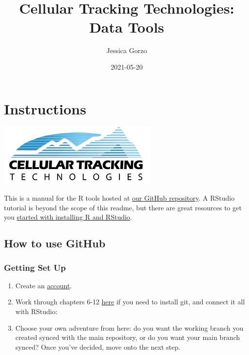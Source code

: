 \documentclass[
]{book}
\title{Cellular Tracking Technologies: Data Tools}
\author{Jessica Gorzo}
\date{2021-05-20}
\providecommand{\tightlist}{%
  \setlength{\itemsep}{0pt}\setlength{\parskip}{0pt}}
\begin{document}
\maketitle

{
\setcounter{tocdepth}{1}
\tableofcontents
}
\hypertarget{instructions}{%
\chapter*{Instructions}\label{instructions}}

\includegraphics{bookdown-demo_files/figure-html/unnamed.png}

This is a manual for the R tools hosted at \href{https://github.com/cellular-tracking-technologies/data_tools}{our GitHub repository}. A RStudio tutorial is beyond the scope of this readme, but there are great resources to get you \href{https://www.earthdatascience.org/courses/earth-analytics/document-your-science/setup-r-rstudio/}{started with installing R and RStudio}.

\hypertarget{how-to-use-github}{%
\section*{How to use GitHub}\label{how-to-use-github}}

\hypertarget{getting-set-up}{%
\subsection*{Getting Set Up}\label{getting-set-up}}

\begin{enumerate}
\def\labelenumi{\arabic{enumi}.}
\tightlist
\item
  Create an \href{https://github.com}{account}.
\item
  Work through chapters 6-12 \href{https://happygitwithr.com/install-git.html}{here} if you need to install git, and connect it all with RStudio:
\item
  Choose your own adventure from here: do you want the working branch you created synced with the main repository, or do you want your main branch synced? Once you've decided, move onto the next step.
\end{enumerate}
\end{document}
